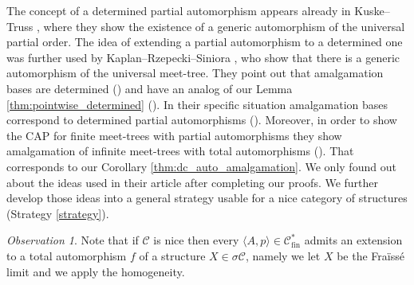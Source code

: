 \documentclass[10pt,a4paper]{article}
\theoremstyle{definition}
\theoremstyle{remark}
\newtheorem{observation}[tw]{Observation}
\newcommand \seq [1]{\langle #1 \rangle}
\newcommand \C {\mathscr{C}}
\newcommand \fin {{\operatorname{fin}}}
\begin{document}
The concept of a determined partial automorphism appears already in Kuske--Truss \cite{KuTr}, where they show the existence of a generic automorphism of the universal partial order. The idea of extending a partial automorphism to a determined one was further used by Kaplan--Rzepecki--Siniora \cite{KaRzSi}, who show that there is a generic automorphism of the universal meet-tree. They point out that amalgamation bases are determined (\cite[Proposition 4.2]{KaRzSi}) and have an analog of our Lemma \ref{thm:pointwise_determined}  (\cite[Lemma 4.11]{KaRzSi}). In their specific situation amalgamation bases correspond to determined partial automorphisms (\cite[Corollary 4.19]{KaRzSi}).
Moreover, in order to show the CAP for finite meet-trees with partial automorphisms they show amalgamation of infinite meet-trees with total automorphisms (\cite[Lemma 4.16]{KaRzSi}). That corresponds to our Corollary \ref{thm:dc_auto_amalgamation}.
We only found out about the ideas used in their article after completing our proofs. We further develop those ideas into a general strategy usable for a nice category of structures (Strategy \ref{strategy}).



\begin{observation} \label{obs:totalization_exists}
Note that if $\C$ is nice then every $\seq{A, p} \in \C_\fin^*$ admits an extension to a total automorphism $f$ of a structure $X \in \sigma\C$, namely we let $X$ be the Fraïssé limit and we apply the homogeneity.
\end{observation}
\end{document}
